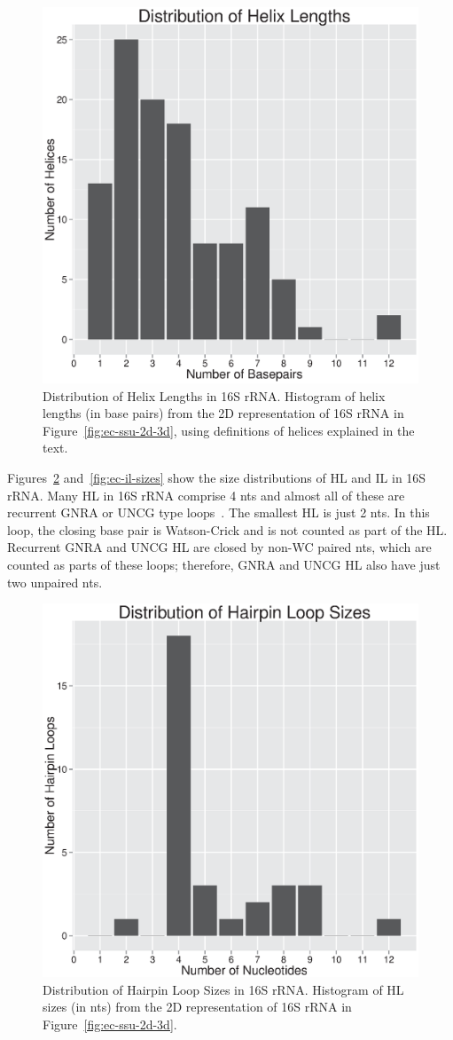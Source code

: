\begin{figure}
  \includegraphics[width=0.5\linewidth]{chapter-1/figs/helix-lengths.eps}
  \caption{Distribution of Helix Lengths in 16S rRNA\@. Histogram of helix lengths
    (in base pairs) from the 2D representation of 16S rRNA in
  Figure~\ref{fig:ec-ssu-2d-3d}, using definitions of helices explained in the
text.}
\label{fig:ec-helix-lengths}
\end{figure}

Figures~\ref{fig:ec-hl-sizes} and~\ref{fig:ec-il-sizes} show the size
distributions of HL and IL in 16S rRNA\@. Many HL in 16S rRNA comprise 4 nts and
almost all of these are recurrent GNRA or UNCG type loops~\cite{Woese1990a}. The
smallest HL is just 2 nts. In this loop, the closing base pair is Watson-Crick
and is not counted as part of the HL\@. Recurrent GNRA and UNCG HL are closed by
non-WC paired nts, which are counted as parts of these loops; therefore, GNRA
and UNCG HL also have just two unpaired nts. 

\begin{figure}
  \includegraphics[width=0.5\linewidth]{chapter-1/figs/hl-sizes}
  \caption{Distribution of Hairpin Loop Sizes in 16S rRNA\@. Histogram of HL sizes
    (in nts) from the 2D representation of 16S rRNA in
  Figure~\ref{fig:ec-ssu-2d-3d}.}
\label{fig:ec-hl-sizes}
\end{figure}

